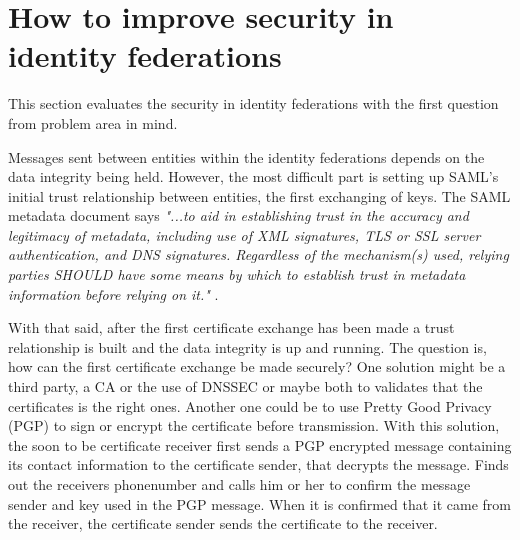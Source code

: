\section{How to improve security in identity federations}

This section evaluates the security in identity federations with the first question from problem area in mind.

Messages sent between entities within the identity federations depends on the data integrity being held.
However, the most difficult part is setting up SAML's initial trust relationship between entities, the first exchanging of keys.
The SAML metadata document says \emph{"...to aid in establishing trust in the accuracy and legitimacy of metadata,
including use of XML signatures, TLS or SSL server authentication, and DNS signatures.
Regardless of the mechanism(s) used, relying parties SHOULD have some means by which to establish trust in metadata information
before relying on it."} \cite[p.~29]{pdf:oasis-open-metadata}.

With that said, after the first certificate exchange has been made a trust relationship is built and the data integrity is up and running. 
The question is, how can the first certificate exchange be made securely? 
One solution might be a third party, a CA or the use of DNSSEC or maybe both to validates that the certificates is the right ones.
Another one could be to use Pretty Good Privacy (PGP)  \cite{rfc:2440} to sign or encrypt the certificate before transmission.
With this solution, the soon to be certificate receiver first sends a PGP encrypted message containing its contact
information to the certificate sender, that decrypts the message. Finds out the receivers phonenumber and calls him or her
to confirm the message sender and key used in the PGP message.
When it is confirmed that it came from the receiver, the certificate sender sends the certificate to the receiver.

